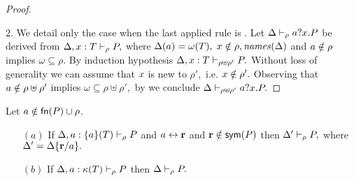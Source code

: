 \begin{proof}
\begin{itemize}
\end{itemize}
$\mathit{2.}$ We detail only the case when the last applied rule is . Let $ \Delta\vdash_\rho a?x.P$ be derived from $ \Delta, x:T \vdash_{\rho} P,$ where $\Delta(a)=\omega(T),$ $x\notin\rho, \mathit{names}(\Delta)$ and $a\notin\rho$ implies $\omega \subseteq\rho.$ By induction hypothesis $ \Delta, x: T \vdash_{\rho\uplus\rho'} P.$ Without loss of generality we can assume that $x$ is new to $\rho',$ i.e. $x\notin\rho'.$ Observing that $a\notin\rho\uplus\rho'$ implies $\omega \subseteq\rho\uplus\rho',$ by  we conclude $ \Delta\vdash_{\rho\uplus\rho'} a?x.P.$
\end{proof}

\begin{lemma}[Strengthening]\label{lemm:Strength.Lemmma}
Let $a\notin\mathsf{fn}(P) \cup \rho$.
\begin{itemize}
\item [$(a)$]If $ \Delta, a: \{a\}(T) \vdash_{\rho} P$  and $a \leftrightarrow {\mathbf{r}}$ and ${\mathbf{r}}\notin \mathsf{sym}(P)$ then $ \Delta'\vdash_{\rho} P,$ where $\Delta'=\Delta\{{\mathbf{r}}/a\}.$
\item [$(b)$] If $ \Delta, a: {\mathbf{\kappa}} (T) \vdash_{\rho} P$ then $ \Delta\vdash_{\rho} P.$ 
\end{itemize}
\end{lemma}

